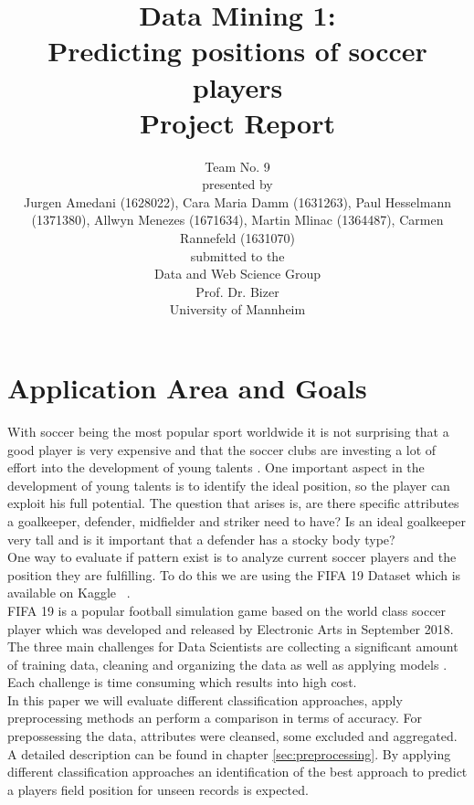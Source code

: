 \documentclass[runningheads]{llncs}
\begin{document}
%
\title{Data Mining 1: \\
Predicting positions of soccer players  \\
Project Report}

\vspace{2cm}
\author{Team No. 9\\
\vspace{1cm}
presented by\\
Jurgen Amedani (1628022), Cara Maria Damm (1631263), Paul Hesselmann (1371380), Allwyn Menezes (1671634), Martin Mlinac (1364487), Carmen Rannefeld (1631070)\\
\vspace{1cm}
submitted to the \\
Data and Web Science Group\\
Prof. Dr. Bizer\\
University of Mannheim}

\institute{}
\maketitle
\newpage



\section{Application Area and Goals}
\label{intro}
With soccer being the most popular sport worldwide it is not surprising that a good player is very expensive and that the soccer clubs are investing a lot of effort into the development of young talents \cite{ref_Transfermarkt}. One important aspect in the development of young talents is to identify the ideal position, so the player can exploit his full potential.
The question that arises is, are there specific attributes a goalkeeper, defender, midfielder and striker need to have? Is an ideal goalkeeper very tall and is it important that a defender has a stocky body type?\\
One way to evaluate if pattern exist is to analyze current soccer players and the position they are fulfilling. To do this we are using the FIFA 19 Dataset which is available on Kaggle ~\cite{ref_kaggle}.\\
FIFA 19 is a popular football simulation game based on the world class soccer player which was developed and released by Electronic Arts in September 2018. \\
The three main challenges for Data Scientists are collecting a significant amount of training data, cleaning and organizing the data as well as applying models  \cite{ref_Crowdflower}. Each challenge is time consuming which results into high cost.\\
In this paper we will evaluate different classification approaches, apply preprocessing methods an perform a comparison in terms of accuracy. For prepossessing the data, attributes were cleansed, some excluded and aggregated. A detailed description can be found in chapter \ref{sec:preprocessing}.
By applying different classification approaches an identification of the best approach to predict a players field position for unseen records is expected.
\end{document}
